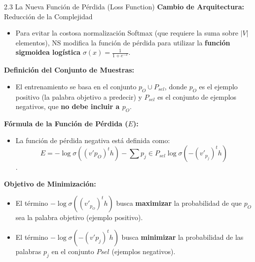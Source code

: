 \documentclass{beamer}
\begin{document}
\begin{frame}{2.3  La Nueva Función de Pérdida (Loss Function)}
	\textbf{Cambio de Arquitectura:} Reducción de la Complejidad\\
	\begin{itemize}
		\item Para evitar la costosa normalización Softmax (que requiere la suma sobre $|V|$ elementos), NS modifica la función de pérdida para utilizar la \textbf{función sigmoidea logística} $\sigma(x) = \frac{1}{1 + e^{-x}}$.
	\end{itemize}
	
	\textbf{Definición del Conjunto de Muestras:}\\
	\begin{itemize}
		\item El entrenamiento se basa en el conjunto ${p_O} \cup P_{sel}$, donde $p_O$ es el ejemplo positivo (la palabra objetivo a predecir) y $P_{sel}$ es el conjunto de ejemplos negativos, que \textbf{no debe incluir a $p_O$}.	
	\end{itemize}
	\textbf{Fórmula de la Función de Pérdida ($E$):}\\
	\begin{itemize}
		\item La función de pérdida negativa está definida como: $$ E = -\log \sigma((v'{p_O})^t h) - \sum{p_j \in P_{sel}} \log \sigma(-(v'_{p_j})^t h) $$.	
	\end{itemize}
	\textbf{Objetivo de Minimización:}\\
	\begin{itemize}
		\item El término $-\log \sigma((v'_{p_O})^t h)$ busca \textbf{maximizar} la probabilidad de que $p_O$ sea la palabra objetivo (ejemplo positivo).
		\item El término $-\log \sigma(-(v'{p_j})^t h)$ busca \textbf{minimizar} la probabilidad de las palabras $p_j$ en el conjunto $P{sel}$ (ejemplos negativos).
	\end{itemize}
	
	
\end{frame}	
	
	
	
\end{document}
